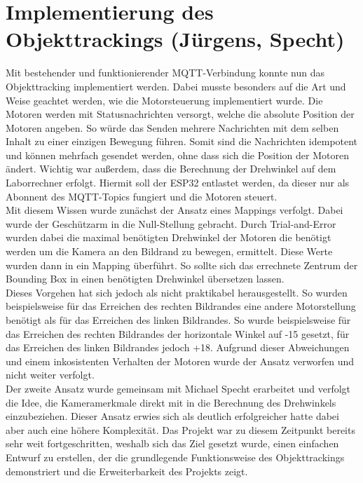 \section{Implementierung des Objekttrackings (Jürgens, Specht)} \label{sec:objekttracking}
Mit bestehender und funktionierender MQTT-Verbindung konnte nun das Objekttracking implementiert werden. Dabei musste besonders auf die Art und Weise geachtet werden, wie die Motorsteuerung implementiert wurde. Die Motoren werden mit Statusnachrichten versorgt, welche die absolute Position der Motoren angeben. So würde das Senden mehrere Nachrichten mit dem selben Inhalt zu einer einzigen Bewegung führen. Somit sind die Nachrichten idempotent und können mehrfach gesendet werden, ohne dass sich die Position der Motoren ändert.
Wichtig war außerdem, dass die Berechnung der Drehwinkel auf dem Laborrechner erfolgt. Hiermit soll der ESP32 entlastet werden, da dieser nur als Abonnent des MQTT-Topics fungiert und die Motoren steuert. 
\\
Mit diesem Wissen wurde zunächst der Ansatz eines Mappings verfolgt. Dabei wurde der Geschützarm in die Null-Stellung gebracht. Durch Trial-and-Error wurden dabei die maximal benötigten Drehwinkel der Motoren die benötigt werden um die Kamera an den Bildrand zu bewegen, ermittelt. Diese Werte wurden dann in ein Mapping überführt. So sollte sich das errechnete Zentrum der Bounding Box in einen benötigten Drehwinkel übersetzen lassen.\\
Dieses Vorgehen hat sich jedoch als nicht praktikabel herausgestellt. So wurden beispielsweise für das Erreichen des rechten Bildrandes eine andere Motorstellung benötigt als für das Erreichen des linken Bildrandes. So wurde beispielsweise für das Erreichen des rechten Bildrandes der horizontale Winkel auf -15 gesetzt, für das Erreichen des linken Bildrandes jedoch +18. Aufgrund dieser Abweichungen und einem inkosistenten Verhalten der Motoren wurde der Ansatz verworfen und nicht weiter verfolgt.
\\
Der zweite Ansatz wurde gemeinsam mit Michael Specht erarbeitet und verfolgt die Idee, die Kameramerkmale direkt mit in die Berechnung des Drehwinkels einzubeziehen. Dieser Ansatz erwies sich als deutlich erfolgreicher hatte dabei aber auch eine höhere Komplexität. Das Projekt war zu diesem Zeitpunkt bereits sehr weit fortgeschritten, weshalb sich das Ziel gesetzt wurde, einen einfachen Entwurf zu erstellen, der die grundlegende Funktionsweise des Objekttrackings demonstriert und die Erweiterbarkeit des Projekts zeigt. \newline

